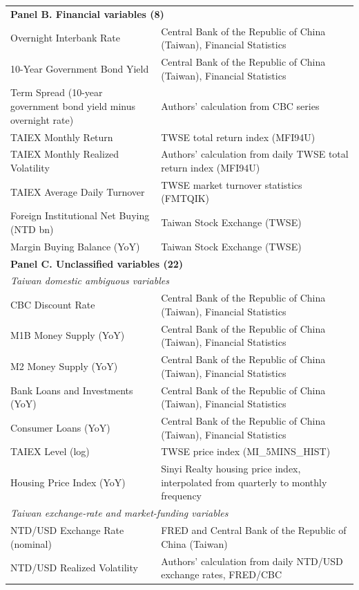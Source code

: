 \begin{center}
\begin{longtable}{p{7.1cm} p{7.1cm}}
\hline
\multicolumn{2}{l}{\textbf{Panel B. Financial variables (8)}}\\
Overnight Interbank Rate & Central Bank of the Republic of China (Taiwan), Financial Statistics \\
10-Year Government Bond Yield & Central Bank of the Republic of China (Taiwan), Financial Statistics \\
Term Spread (10-year government bond yield minus overnight rate) & Authors' calculation from CBC series \\
TAIEX Monthly Return & TWSE total return index (MFI94U) \\
TAIEX Monthly Realized Volatility & Authors' calculation from daily TWSE total return index (MFI94U) \\
TAIEX Average Daily Turnover & TWSE market turnover statistics (FMTQIK) \\
Foreign Institutional Net Buying (NTD bn) & Taiwan Stock Exchange (TWSE) \\
Margin Buying Balance (YoY) & Taiwan Stock Exchange (TWSE) \\
\hline
\multicolumn{2}{l}{\textbf{Panel C. Unclassified variables (22)}}\\
\multicolumn{2}{l}{\textit{Taiwan domestic ambiguous variables}}\\
CBC Discount Rate & Central Bank of the Republic of China (Taiwan), Financial Statistics \\
M1B Money Supply (YoY) & Central Bank of the Republic of China (Taiwan), Financial Statistics \\
M2 Money Supply (YoY) & Central Bank of the Republic of China (Taiwan), Financial Statistics \\
Bank Loans and Investments (YoY) & Central Bank of the Republic of China (Taiwan), Financial Statistics \\
Consumer Loans (YoY) & Central Bank of the Republic of China (Taiwan), Financial Statistics \\
TAIEX Level (log) & TWSE price index (MI\_5MINS\_HIST) \\
Housing Price Index (YoY) & Sinyi Realty housing price index, interpolated from quarterly to monthly frequency \\
\multicolumn{2}{l}{\textit{Taiwan exchange-rate and market-funding variables}}\\
NTD/USD Exchange Rate (nominal) & FRED and Central Bank of the Republic of China (Taiwan) \\
NTD/USD Realized Volatility & Authors' calculation from daily NTD/USD exchange rates, FRED/CBC \\

\end{longtable}
\end{center}
